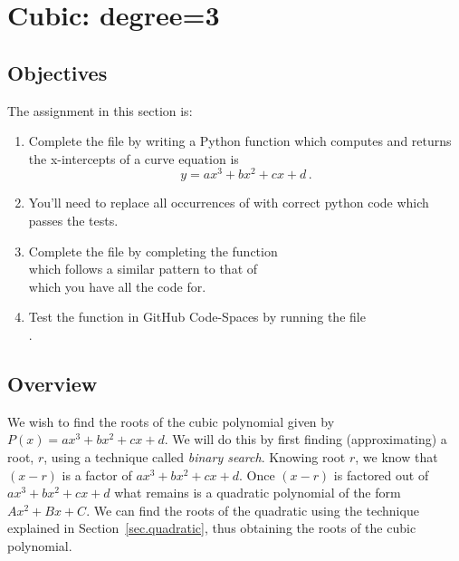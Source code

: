 \section{Cubic: degree=3}
\label{sec.cubic}

\subsection{Objectives}
The assignment in this section is:
\begin{enumerate}
\item Complete the file  by writing a Python
  function which computes and returns the x-intercepts of a curve
  equation is \[y=a x^3 + b x^2 + c x + d\,.\]
\item You'll need to replace all occurrences of 
  with correct python code which passes the tests.

\item Complete the file  by completing the function \\
  which follows a similar pattern to that of \\
   which you have all the code for.

\item Test the function in GitHub Code-Spaces by running the file\\
  .
\end{enumerate}

\subsection{Overview}

We wish to find the roots of the cubic polynomial given by $P(x) = a
x^3 + b x^2 + c x + d$.  We will do this by first finding
(approximating) a root, $r$, using a technique called \emph{binary
search}.  Knowing root $r$, we know that $(x-r)$ is a factor of $a x^3 + b x^2 + c x + d$.
Once $(x-r)$ is factored out of $a x^3 + b x^2 + c x + d$
what remains is a quadratic polynomial of the form $A x^2 + B x + C$.
We can find the roots of the quadratic using the technique
explained in Section~\ref{sec.quadratic}, thus obtaining the roots of
the cubic polynomial.


